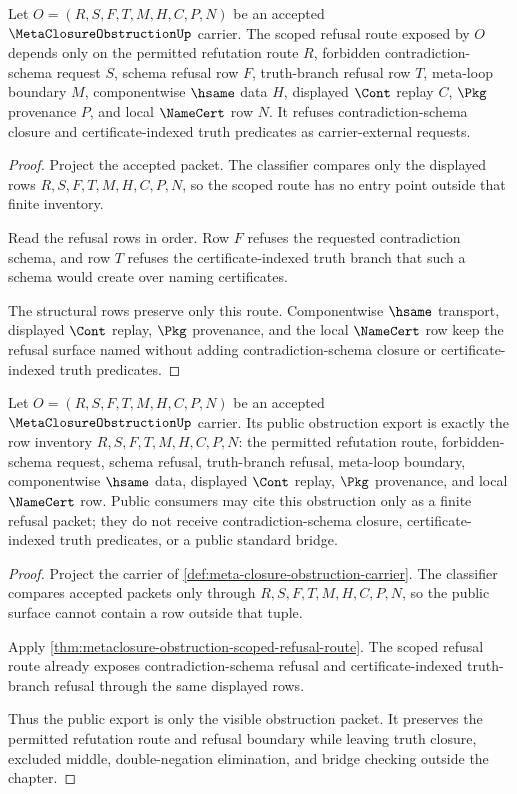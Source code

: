 \begin{theorem}
\label{thm:metaclosure-obstruction-scoped-refusal-route}
Let $O=(R,S,F,T,M,H,C,P,N)$ be an accepted $\MetaClosureObstructionUp$ carrier. The scoped refusal route exposed by $O$ depends only on the permitted refutation route $R$, forbidden contradiction-schema request $S$, schema refusal row $F$, truth-branch refusal row $T$, meta-loop boundary $M$, componentwise $\hsame$ data $H$, displayed $\Cont$ replay $C$, $\Pkg$ provenance $P$, and local $\NameCert$ row $N$. It refuses contradiction-schema closure and certificate-indexed truth predicates as carrier-external requests.
\end{theorem}
\begin{proof}
Project the accepted packet. The classifier compares only the displayed rows $R,S,F,T,M,H,C,P,N$, so the scoped route has no entry point outside that finite inventory.

Read the refusal rows in order. Row $F$ refuses the requested contradiction schema, and row $T$ refuses the certificate-indexed truth branch that such a schema would create over naming certificates.

The structural rows preserve only this route. Componentwise $\hsame$ transport, displayed $\Cont$ replay, $\Pkg$ provenance, and the local $\NameCert$ row keep the refusal surface named without adding contradiction-schema closure or certificate-indexed truth predicates.
\end{proof}

\begin{theorem}
\label{thm:metaclosure-obstruction-public-export}
Let $O=(R,S,F,T,M,H,C,P,N)$ be an accepted $\MetaClosureObstructionUp$ carrier. Its public obstruction export is exactly the row inventory $R,S,F,T,M,H,C,P,N$: the permitted refutation route, forbidden-schema request, schema refusal, truth-branch refusal, meta-loop boundary, componentwise $\hsame$ data, displayed $\Cont$ replay, $\Pkg$ provenance, and local $\NameCert$ row. Public consumers may cite this obstruction only as a finite refusal packet; they do not receive contradiction-schema closure, certificate-indexed truth predicates, or a public standard bridge.
\end{theorem}
\begin{proof}
Project the carrier of \autoref{def:meta-closure-obstruction-carrier}. The classifier compares accepted packets only through $R,S,F,T,M,H,C,P,N$, so the public surface cannot contain a row outside that tuple.

Apply \autoref{thm:metaclosure-obstruction-scoped-refusal-route}. The scoped refusal route already exposes contradiction-schema refusal and certificate-indexed truth-branch refusal through the same displayed rows.

Thus the public export is only the visible obstruction packet. It preserves the permitted refutation route and refusal boundary while leaving truth closure, excluded middle, double-negation elimination, and bridge checking outside the chapter.
\end{proof}

